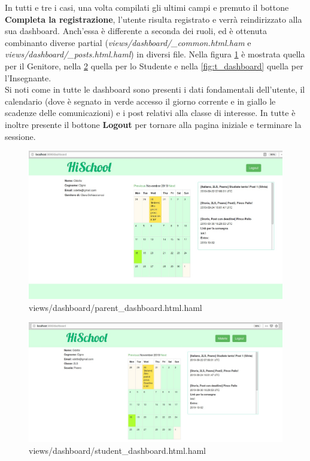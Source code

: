 \documentclass[Lau, binding=0.6cm, oneside]{sapthesis}
\begin{document}
In tutti e tre i casi, una volta compilati gli ultimi campi e premuto il bottone \textbf{Completa la registrazione}, l'utente risulta registrato e verrà reindirizzato alla sua dashboard. Anch'essa è differente a seconda dei ruoli, ed è ottenuta combinanto diverse partial (\textit{views/dashboard/\_common.html.ham} e \textit{views/dashboard/\_posts.html.haml}) in diversi file. Nella figura \ref{fig:p_dashboard} è mostrata quella per il Genitore, nella \ref{fig:s_dashboard} quella per lo Studente e nella \ref{fig:t_dashboard} quella per l'Insegnante.\\
Si noti come in tutte le dashboard sono presenti i dati fondamentali dell'utente, il calendario (dove è segnato in verde accesso il giorno corrente e in giallo le scadenze delle comunicazioni) e i post relativi alla classe di interesse. In tutte è inoltre presente il bottone \textbf{Logout} per tornare alla pagina iniziale e terminare la sessione.

\begin{figure}[H]
	\centering
	\includegraphics[width=1\linewidth]{images/p_dashboard} 
	\caption{views/dashboard/parent\_dashboard.html.haml}
	\label{fig:p_dashboard}
\end{figure}

\begin{figure}[H]
	\centering
	\includegraphics[width=1\linewidth]{images/s_dashboard} 
	\caption{views/dashboard/student\_dashboard.html.haml}
	\label{fig:s_dashboard}
\end{figure}
\end{document}
